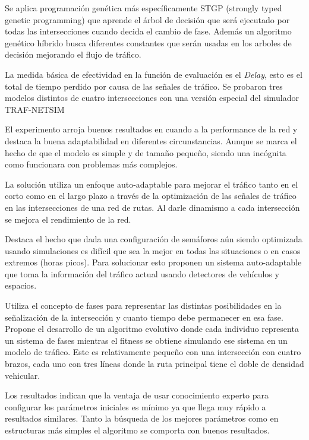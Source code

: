 \begin{itemize}
\begin{item}
		Se aplica programación genética más específicamente STGP (strongly typed genetic programming) \citep{Montana1995} que aprende el árbol de decisión que será ejecutado por todas las intersecciones cuando decida el cambio de fase. Además un algoritmo genético híbrido busca diferentes constantes que serán usadas en los arboles de decisión mejorando el flujo de tráfico.
		
		La medida básica de efectividad en la función de evaluación es el \emph{Delay}, esto es el total de tiempo perdido por causa de las señales de tráfico. Se probaron tres modelos distintos de cuatro intersecciones con una versión especial del simulador  TRAF-NETSIM \citep{TRAF-NETSIM}
		
		El experimento arroja buenos resultados en cuando a la performance de la red y destaca la buena adaptabilidad en diferentes circunstancias. Aunque se marca el hecho de que el modelo es simple y de tamaño pequeño, siendo una incógnita como funcionara con problemas más complejos.
		
	\end{item}	
	
	
	\begin{item}
		
		La solución utiliza un enfoque auto-adaptable para mejorar el tráfico tanto en el corto como en el largo plazo a través de la optimización de las señales de tráfico en las intersecciones de una red de rutas. Al darle dinamismo a cada intersección se mejora el rendimiento de la red.
		
		Destaca el hecho que dada una configuración de semáforos aún siendo optimizada usando simulaciones es difícil que sea la mejor en todas las situaciones o en casos extremos (horas picos). Para solucionar esto proponen un sistema auto-adaptable que toma la información del tráfico actual usando detectores de vehículos y espacios.
		
		Utiliza el concepto de fases para representar las distintas posibilidades en la señalización de la intersección y cuanto tiempo debe permanecer en esa fase. 
		Propone el desarrollo de un algoritmo evolutivo donde cada individuo representa un sistema de fases mientras el fitness se obtiene simulando ese sistema en un modelo de tráfico. Este es relativamente pequeño con una intersección con cuatro brazos, cada uno con tres líneas donde la ruta principal tiene el doble de densidad vehicular. 
		
		Los resultados indican que la ventaja de usar conocimiento experto para configurar los parámetros iniciales es mínimo ya que llega muy rápido a resultados similares. Tanto la búsqueda de los mejores parámetros como en estructuras más simples el algoritmo se comporta con buenos resultados.
		

\end{item}
\end{itemize}
